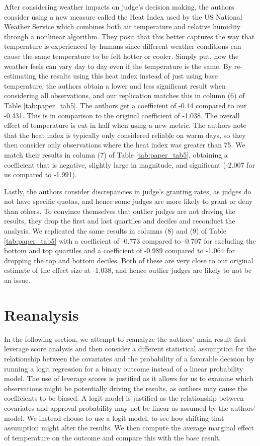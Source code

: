 \documentclass{article}
\begin{document}
	After considering weather impacts on judge's decision making, the authors consider using a new measure called the Heat Index used by the US National Weather Service which combines both air temperature and relative humidity through a nonlinear algorithm. They posit that this better captures the way that temperature is experienced by humans since different weather conditions can cause the same temperature to be felt hotter or cooler. Simply put, how the weather feels can vary day to day even if the temperature is the same. By re-estimating the results using this heat index instead of just using base temperature, the authors obtain a lower and less significant result when considering all observations, and our replication matches this in column (6) of Table \ref{tab:paper_tab5}. The authors get a coefficient of -0.44 compared to our -0.431. This is in comparison to the original coefficient of -1.038. The overall effect of temperature is cut in half when using a new metric. The authors note that the heat index is typically only considered reliable on warm days, so they then consider only observations where the heat index was greater than 75. We match their results in column (7) of Table \ref{tab:paper_tab5}, obtaining a coefficient that is negative, slightly large in magnitude, and significant (-2.007 for us compared to -1.991). 
	
	Lastly, the authors consider discrepancies in judge's granting rates, as judges do not have specific quotas, and hence some judges are more likely to grant or deny than others. To convince themselves that outlier judges are not driving the results, they drop the first and last quartiles and deciles and reconduct the analysis. We replicated the same results in columns (8) and (9) of Table \ref{tab:paper_tab5} with a coefficient of -0.773 compared to -0.707 for excluding the bottom and top quartiles and a coefficient of -0.989 compared to -1.064 for dropping the top and bottom deciles. Both of these are very close to our original estimate of the effect size at -1.038, and hence outlier judges are likely to not be an issue.
	
	
	\section{Reanalysis} 
	
	In the following section, we attempt to reanalyze the authors' main result first leverage score analysis and then consider a different statistical assumption for the relationship between the covariates and the probability of a favorable decision by running a logit regression for a binary outcome instead of a linear probability model. The use of leverage scores is justified as it allows for us to examine which observations might be potentially driving the results, as outliers may cause the coefficients to be biased. A logit model is justified as the relationship between covariates and approval probability may not be linear as assumed by the authors' model. We instead choose to use a logit model, to see how shifting that assumption might alter the results. We then compute the average marginal effect of temperature on the outcome and compare this with the base result. 
	
\end{document}
